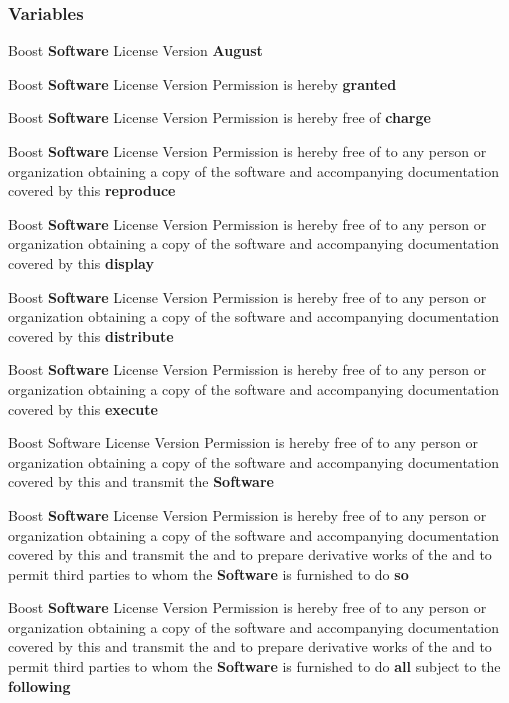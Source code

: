\subsubsection*{Variables}
\begin{DoxyCompactItemize}
\item 
Boost {\bf Software} License Version {\bf August}
\item 
Boost {\bf Software} License Version Permission is hereby {\bf granted}
\item 
Boost {\bf Software} License Version Permission is hereby free of {\bf charge}
\item 
Boost {\bf Software} License Version Permission is hereby free of to any person or organization obtaining a copy of the software and accompanying documentation covered by this {\bf reproduce}
\item 
Boost {\bf Software} License Version Permission is hereby free of to any person or organization obtaining a copy of the software and accompanying documentation covered by this {\bf display}
\item 
Boost {\bf Software} License Version Permission is hereby free of to any person or organization obtaining a copy of the software and accompanying documentation covered by this {\bf distribute}
\item 
Boost {\bf Software} License Version Permission is hereby free of to any person or organization obtaining a copy of the software and accompanying documentation covered by this {\bf execute}
\item 
Boost Software License Version Permission is hereby free of to any person or organization obtaining a copy of the software and accompanying documentation covered by this and transmit the {\bf Software}
\item 
Boost {\bf Software} License Version Permission is hereby free of to any person or organization obtaining a copy of the software and accompanying documentation covered by this and transmit the and to prepare derivative works of the and to permit third parties to whom the {\bf Software} is furnished to do {\bf so}
\item 
Boost {\bf Software} License Version Permission is hereby free of to any person or organization obtaining a copy of the software and accompanying documentation covered by this and transmit the and to prepare derivative works of the and to permit third parties to whom the {\bf Software} is furnished to do {\bf all} subject to the {\bf following}
\item 

\end{DoxyCompactItemize}
